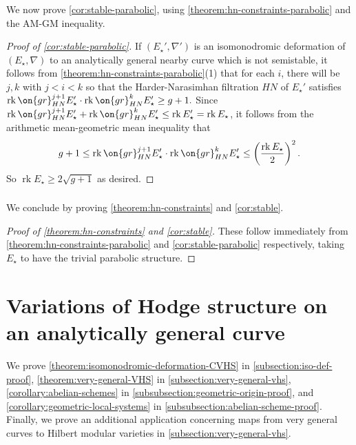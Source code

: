\documentclass[12 pt]{amsart}
\theoremstyle{plain}
\theoremstyle{definition}
\theoremstyle{remark}
\numberwithin{equation}{section}
\DeclareMathOperator\rk{rk}
\begin{document}
\subsubsection{}
\label{subsubsection:corollary-proof}
We now prove \autoref{cor:stable-parabolic}, using
\autoref{theorem:hn-constraints-parabolic}
and the AM-GM inequality.
\begin{proof}[Proof of \autoref{cor:stable-parabolic}]

If $(E_\star', \nabla')$ is an isomonodromic deformation of $(E_\star,\nabla)$ to an
	analytically general nearby curve which is not semistable, it follows from
	\autoref{theorem:hn-constraints-parabolic}(1) that for each $i$, there will be $j,k$ with
	$j<i<k$ so that the Harder-Narasimhan filtration $HN$ of $E_\star'$ satisfies
$\rk \on{gr}^{j+1}_{HN}E_\star'\cdot \rk
	\on{gr}^k_{HN}E_\star'\geq g+1.$
	Since $\rk \on{gr}^{j+1}_{HN}E_\star' + \rk \on{gr}^k_{HN}E_\star' \leq \rk E_\star' = \rk
	E_\star$,
	it follows from the arithmetic mean-geometric mean inequality that
	$$g+1\leq \rk \on{gr}^{j+1}_{HN}E_\star'\cdot \rk \on{gr}^k_{HN}E_\star'\leq \left(\frac{\rk
E_\star}{2} \right)^2.$$
So
$\rk E_\star \geq 2 \sqrt{g+1}$ as desired.
\end{proof}

\subsubsection{}
\label{subsection:proof-intro-stable}
We conclude by proving \autoref{theorem:hn-constraints} and
\autoref{cor:stable}.
\begin{proof}[{Proof of \autoref{theorem:hn-constraints} and \autoref{cor:stable}}]
	These follow immediately from \autoref{theorem:hn-constraints-parabolic} and \autoref{cor:stable-parabolic} respectively, taking
	$E_\star$ to have the trivial parabolic structure.
\end{proof}

\section{Variations of Hodge structure on an analytically general curve}\label{section:hodge-theoretic-results}
We prove \autoref{theorem:isomonodromic-deformation-CVHS} in
\autoref{subsection:iso-def-proof},
\autoref{theorem:very-general-VHS} in \autoref{subsection:very-general-vhs}, 
\autoref{corollary:abelian-schemes} in
\autoref{subsubsection:geometric-origin-proof},
and
\autoref{corollary:geometric-local-systems} in
\autoref{subsubsection:abelian-scheme-proof}.
Finally, we prove an additional application concerning maps from very general
curves to Hilbert modular varieties in \autoref{subsection:very-general-vhs}.
\end{document}
